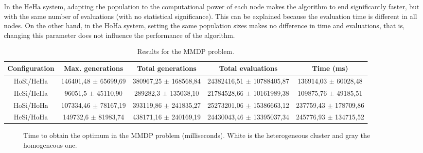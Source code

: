 \documentclass{sig-alternate}
\begin{document}
 In the HeHa system, adapting the population to the computational power of each node makes the algorithm to end significantly faster, but with the same number of evaluations (with no statistical significance). This can be explained because the evaluation time is different in all nodes. On the other hand, in the HoHa system, setting the same population sizes makes no difference in time and evaluations, that is, changing this parameter does not influence the performance of the algorithm. 

\begin{table*}
\centering
\caption{Results for the MMDP problem.}
\begin{tabular}{|c|c|c|c|c|} \hline
Configuration	& Max. generations			& Total generations			& 	Total evaluations			& Time (ms) \\ \hline
HoSi/HeHa		& 146401,48	$\pm$ 65699,69	& 380967,25	$\pm$ 168568,84	& 24382416,51 $\pm$	10788405,87	& 136914,03 $\pm$ 60028,48\\ \hline
HeSi/HeHa		& 96051,5	$\pm$ 45110,90	& 289282,3	$\pm$ 135038,10	& 21784528,66 $\pm$	10161989,38	& 109875,76 $\pm$ 49185,51\\ \hline \hline
HoSi/HoHa		& 107334,46 $\pm$ 78167,19  & 393119,86 $\pm$ 241835,27	& 25273201,06 $\pm$ 15386663,12	& 237759,43 $\pm$ 178709,86\\ \hline
HeSi/HoHa		& 149732,6 $\pm$ 81983,74	& 438171,16	$\pm$ 240169,19	& 24430043,46 $\pm$ 13395037,34	& 245776,93 $\pm$ 134715,52\\ \hline

\end{tabular}
\label{tab:resultsMMDP}
\end{table*}






\begin{figure}
\centering
{}
\caption{Time to obtain the optimum in the MMDP problem (milliseconds). White is the heterogeneous cluster and gray the homogeneous one.}
\label{fig:timeMMDP}
\end{figure}
\end{document}
